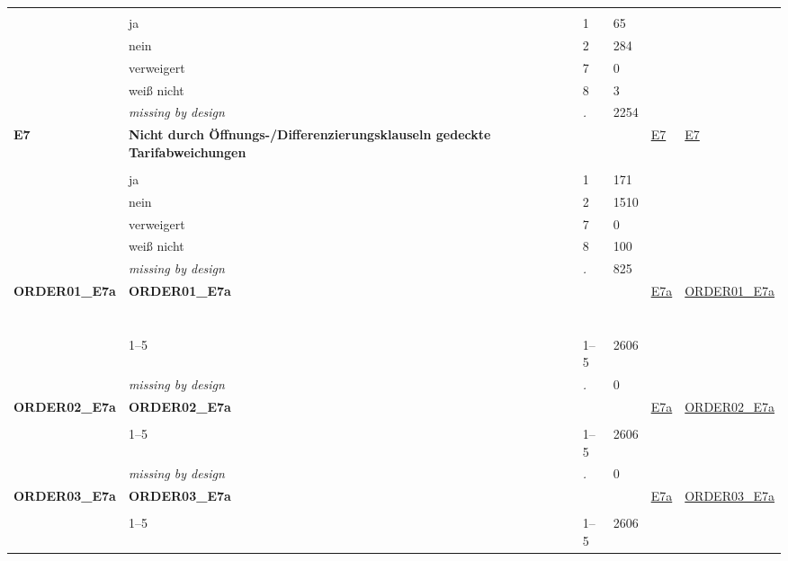 \begin{longtable}{| L{2.45cm} | L{6cm} | C{1.5cm} | R{1cm} | C{2.25cm} | C{2.25cm} |}
   &  &  &  &  &  \\ 
   & ja & 1 & 65 &  &  \\ 
   & nein & 2 & 284 &  &  \\ 
   & verweigert & 7 & 0 &  &  \\ 
   & weiß nicht & 8 & 3 &  &  \\ 
   & \textit{missing by design} & \textit{.} & 2254 &  &  \\ 
   \midrule
\textbf{E7}\label{var:E7} & \textbf{Nicht durch Öffnungs-/Differenzierungsklauseln gedeckte Tarifabweichungen} &  &  & \hyperref[E7]{E7} & \hyperref[var:suf:E7]{E7} \\ 
   &  &  &  &  &  \\ 
   & ja & 1 & 171 &  &  \\ 
   & nein & 2 & 1510 &  &  \\ 
   & verweigert & 7 & 0 &  &  \\ 
   & weiß nicht & 8 & 100 &  &  \\ 
   & \textit{missing by design} & \textit{.} & 825 &  &  \\ 
   \midrule
\textbf{ORDER01\_E7a}\label{var:ORDER01:E7a} & \textbf{ORDER01\_E7a} &  &  & \hyperref[E7a]{E7a} & \hyperref[var:suf:ORDER01:E7a]{ORDER01\_E7a} \\ 
   & \protect\subsection[Variablen ORDER01\_E7a bis F3\_18]{} &  &  &  &  \\ 
   & 1--5 & 1--5 & 2606 &  &  \\ 
   & \textit{missing by design} & \textit{.} & 0 &  &  \\ 
   \midrule
\textbf{ORDER02\_E7a}\label{var:ORDER02:E7a} & \textbf{ORDER02\_E7a} &  &  & \hyperref[E7a]{E7a} & \hyperref[var:suf:ORDER02:E7a]{ORDER02\_E7a} \\ 
   &  &  &  &  &  \\ 
   & 1--5 & 1--5 & 2606 &  &  \\ 
   & \textit{missing by design} & \textit{.} & 0 &  &  \\ 
   \midrule
\textbf{ORDER03\_E7a}\label{var:ORDER03:E7a} & \textbf{ORDER03\_E7a} &  &  & \hyperref[E7a]{E7a} & \hyperref[var:suf:ORDER03:E7a]{ORDER03\_E7a} \\ 
   &  &  &  &  &  \\ 
   & 1--5 & 1--5 & 2606 &  &  \\ 

\end{longtable}
